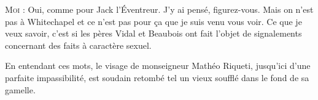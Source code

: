\begin{dialogue}
\textsc{Moi} : Oui, comme pour Jack l’Éventreur. J’y ai pensé, figurez-vous. Mais on n’est pas à Whitechapel et ce n’est pas pour ça que je suis venu vous voir. Ce que je veux savoir, c’est si les pères Vidal et Beaubois ont fait l’objet de signalements concernant des faits à caractère sexuel.

\end{dialogue}

En entendant ces mots, le visage de monseigneur Mathéo Riqueti, jusqu’ici d’une parfaite impassibilité, est soudain retombé tel un vieux soufflé dans le fond de sa gamelle.

